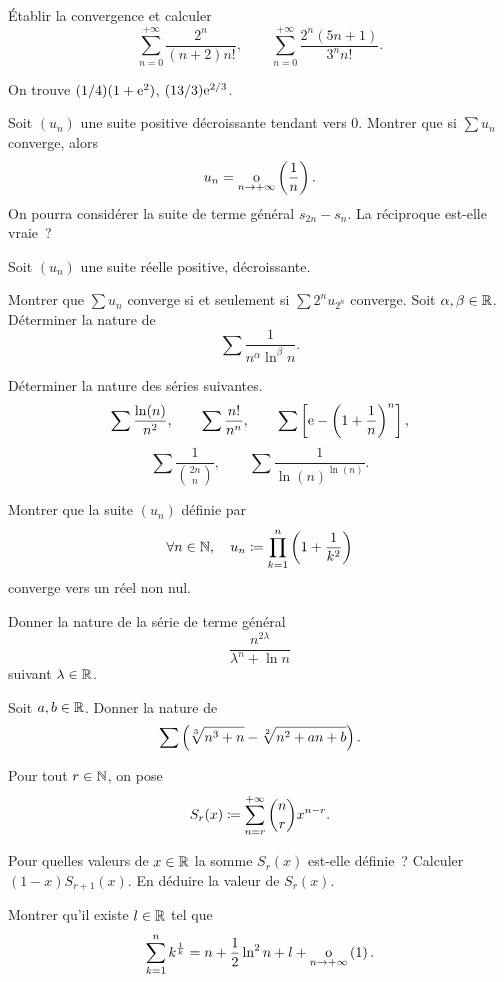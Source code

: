 \documentclass{magnolia}
\begin{document}
Établir la convergence et calculer
\[\sum_{n=0}^{+\infty}\frac{2^n}{(n+2)n!},\qquad
  \sum_{n=0}^{+\infty}\frac{2^n(5n+1)}{3^n n!}.\]
\begin{sol}
On trouve $(1/4)(1+{\rm e}^2)$, $(13/3){\rm e}^{2/3}$.
\end{sol}

Soit $(u_n)$ une suite positive décroissante tendant vers $0$. Montrer que
si $\sum u_n$ converge, alors
\[u_n = \underset{n \rightarrow +\infty}{\text{o}}\left(\frac{1}{n}\right).\]
On pourra considérer la suite de terme général $s_{2n} - s_n$. La réciproque est-elle vraie~?


Soit $(u_n)$ une suite réelle positive, décroissante.
\begin{questions}
\question Montrer que $\sum u_n$ converge si et seulement si $\sum 2^n u_{2^n}$ converge.
\question Soit $\alpha,\beta\in\mathbb{R}$. Déterminer la nature de
  \[\sum \frac{1}{n^{\alpha} \ln^\beta n}.\]
\end{questions}



Déterminer la nature des séries suivantes.
\[\sum \frac{\ln(n)}{n^2},\qquad \sum \frac{n!}{n^n},\qquad \sum \left[{\rm e} - \left(1+\frac 1n\right)^n\right],\]
\[\sum \frac{1}{\binom{2n}{n}}, \qquad \sum \frac{1}{\ln(n)^{\ln(n)}}.\]

Montrer que la suite $(u_n)$ définie par
\[\forall n\in\mathbb{N},\quad u_n \coloneqq \prod_{k=1}^n \left(1+ \frac{1}{k^2}\right)\]
converge vers un réel non nul.

Donner la nature de la série de terme général
\[\frac{n^{2 \lambda}}{\lambda^n + \ln n}\]
suivant $\lambda\in\mathbb{R}$.

Soit $a,b\in\mathbb{R}$. Donner la nature de
\[\sum \left( \sqrt[3]{n^3+n} - \sqrt[2]{n^2+an+b}\right).\]

Pour tout $r \in \mathbb{N}$, on pose
\[S_r(x) \coloneqq \sum_{n=r}^{+\infty} \binom{n}{r} x^{n-r}.\]
\begin{questions}
\question Pour quelles valeurs de $x\in\mathbb{R}$ la somme $S_r(x)$ est-elle définie~?
\question Calculer $(1-x)S_{r+1}(x)$.
\question En déduire la valeur de $S_r(x)$. 
\end{questions}

Montrer qu'il existe $l\in \mathbb{R}$ tel que
\[\sum_{k=1}^n k^{\frac{1}{k}} = n + \frac{1}{2} \ln^2 n+l +\underset{n \rightarrow +\infty}{\text{o}}\left(1\right).\]
\end{document}
